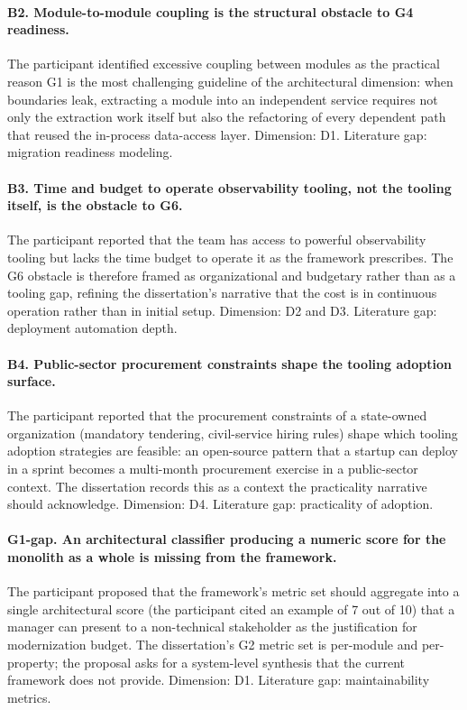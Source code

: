 \paragraph*{B2. Module-to-module coupling is the structural obstacle to G4 readiness.} The participant identified excessive coupling between modules as the practical reason G1 is the most challenging guideline of the architectural dimension: when boundaries leak, extracting a module into an independent service requires not only the extraction work itself but also the refactoring of every dependent path that reused the in-process data-access layer. Dimension: D1. Literature gap: migration readiness modeling.

\paragraph*{B3. Time and budget to operate observability tooling, not the tooling itself, is the obstacle to G6.} The participant reported that the team has access to powerful observability tooling but lacks the time budget to operate it as the framework prescribes. The G6 obstacle is therefore framed as organizational and budgetary rather than as a tooling gap, refining the dissertation's narrative that the cost is in continuous operation rather than in initial setup. Dimension: D2 and D3. Literature gap: deployment automation depth.

\paragraph*{B4. Public-sector procurement constraints shape the tooling adoption surface.} The participant reported that the procurement constraints of a state-owned organization (mandatory tendering, civil-service hiring rules) shape which tooling adoption strategies are feasible: an open-source pattern that a startup can deploy in a sprint becomes a multi-month procurement exercise in a public-sector context. The dissertation records this as a context the practicality narrative should acknowledge. Dimension: D4. Literature gap: practicality of adoption.

\paragraph*{G1-gap. An architectural classifier producing a numeric score for the monolith as a whole is missing from the framework.} The participant proposed that the framework's metric set should aggregate into a single architectural score (the participant cited an example of 7 out of 10) that a manager can present to a non-technical stakeholder as the justification for modernization budget. The dissertation's G2 metric set is per-module and per-property; the proposal asks for a system-level synthesis that the current framework does not provide. Dimension: D1. Literature gap: maintainability metrics.

